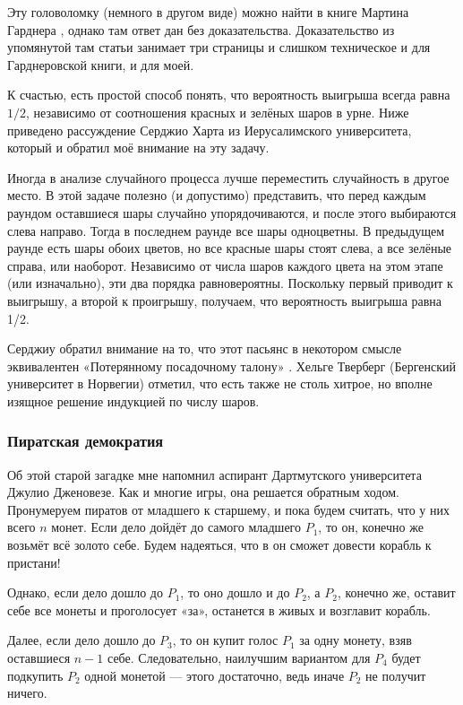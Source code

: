 Эту головоломку (немного в другом виде) можно найти в книге Мартина Гарднера \cite[2.16]{30}, однако там ответ дан без доказательства.
Доказательство из упомянутой там статьи \cite{45} занимает три страницы и слишком техническое и для Гарднеровской книги, и для моей.

К счастью, есть простой способ понять, что вероятность выигрыша всегда равна $1/2$, независимо от соотношения красных и зелёных шаров в урне.
Ниже приведено рассуждение Серджио Харта из Иерусалимского университета, который и обратил моё внимание на эту задачу.

Иногда в анализе случайного процесса лучше переместить случайность в другое место.
В этой задаче полезно (и допустимо) представить, что перед каждым раундом оставшиеся шары случайно упорядочиваются, и после этого выбираются слева направо.
Тогда в последнем раунде все шары одноцветны.
В предыдущем раунде есть шары обоих цветов, но все красные шары стоят слева, а все зелёные справа, или наоборот.
Независимо от числа шаров каждого цвета на этом этапе (или изначально), эти два порядка равновероятны.
Поскольку первый приводит к выигрышу, а второй к проигрышу, получаем, что вероятность выигрыша равна 1/2.

Серджиу обратил внимание на то, что этот пасьянс в некотором смысле эквивалентен «Потерянному посадочному талону» \cite[стр. 42]{59}.
Хельге Тверберг (Бергенский университет в Норвегии) отметил, что есть также не столь хитрое, но вполне изящное решение индукцией по числу шаров.

\subsubsection*{Пиратская демократия}

Об этой старой загадке мне напомнил аспирант Дартмутского университета Джулио Дженовезе.
Как и многие игры, она решается обратным ходом.
Пронумеруем пиратов от младшего к старшему, и пока будем считать, что у них всего $n$ монет.
Если дело дойдёт до самого младшего $P_1$, то он, конечно же возьмёт всё золото себе.
Будем надеяться, что в он сможет довести корабль к пристани!

Однако, если дело дошло до $P_1$, то оно дошло и до $P_2$, а
$P_2$, конечно же, оставит себе все монеты и проголосует «за», останется в живых и возглавит корабль.

Далее, если дело дошло до $P_3$, то он купит голос $P_1$ за одну монету, взяв оставшиеся $n - 1$ себе.
Следовательно, наилучшим вариантом для $P_4$ будет подкупить $P_2$ одной монетой ---
этого достаточно, ведь иначе $P_2$ не получит ничего.

